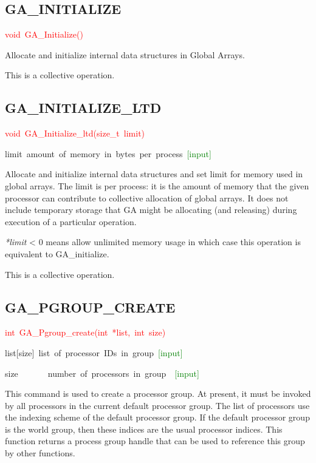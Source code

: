 
\subsection*{\label{sub:GA_INITIALIZE}GA\_INITIALIZE}
\begin{lyxcode}
\textcolor{red}{void~GA\_Initialize()}
\end{lyxcode}
Allocate and initialize internal data structures in Global Arrays.

This is a collective operation. 


\subsection*{\label{sub:GA_INITIALIZE_LTD}GA\_INITIALIZE\_LTD}
\begin{lyxcode}
\textcolor{red}{void~GA\_Initialize\_ltd(size\_t~limit)}



limit~amount~of~memory~in~bytes~per~process~\textcolor{green}{{[}input{]}}
\end{lyxcode}
Allocate and initialize internal data structures and set limit for
memory used in global arrays. The limit is per process: it is the
amount of memory that the given processor can contribute to collective
allocation of global arrays. It does not include temporary storage
that GA might be allocating (and releasing) during execution of a
particular operation.

\emph{{*}limit }< 0 means \textquotedbl{}allow unlimited memory usage\textquotedbl{}
in which case this operation is equivalent to GA\_initialize.

This is a collective operation. 


\subsection*{\label{sub:GA_PGROUP_CREATE}GA\_PGROUP\_CREATE}
\begin{lyxcode}
\textcolor{red}{int~GA\_Pgroup\_create(int~{*}list,~int~size)}



list{[}size{]}~list~of~processor~IDs~in~group~\textcolor{green}{{[}input{]}~}

size~~~~~~~number~of~processors~in~group~~\textcolor{green}{{[}input{]}}
\end{lyxcode}
This command is used to create a processor group. At present, it must
be invoked by all processors in the current default processor group.
The list of processors use the indexing scheme of the default processor
group. If the default processor group is the world group, then these
indices are the usual processor indices. This function returns a process
group handle that can be used to reference this group by other functions.

